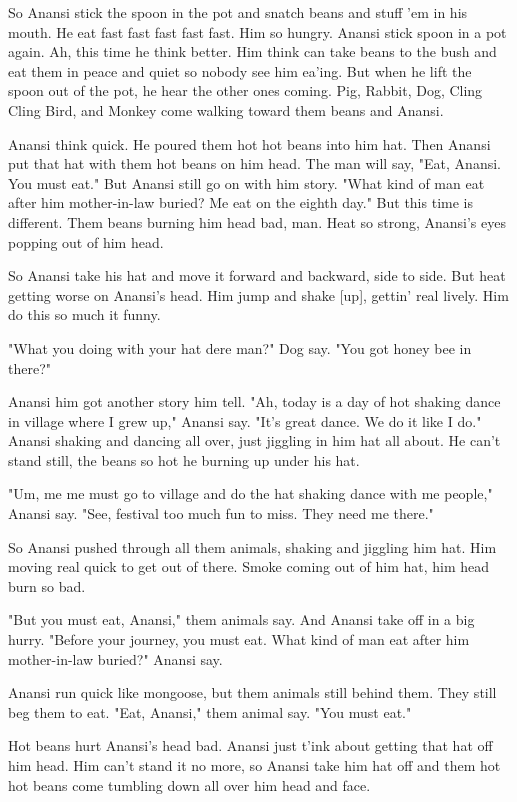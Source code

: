 So Anansi stick the spoon in the pot and snatch beans and stuff 'em in his mouth. He eat fast fast fast fast fast. Him so hungry. Anansi stick spoon in a pot again. Ah, this time he think better. Him think can take beans to the bush and eat them in peace and quiet so nobody see him ea'ing. But when he lift the spoon out of the pot, he hear the other ones coming. Pig, Rabbit, Dog, Cling Cling Bird, and Monkey come walking toward them beans and Anansi.

Anansi think quick. He poured them hot hot beans into him hat. Then Anansi put that hat with them hot beans on him head. The man will say, "Eat, Anansi. You must eat." But Anansi still go on with him story. "What kind of man eat after him mother-in-law buried? Me eat on the eighth day." But this time is different. Them beans burning him head bad, man. Heat so strong, Anansi's eyes popping out of him head.

So Anansi take his hat and move it forward and backward, side to side. But heat getting worse on Anansi's head. Him jump and shake [up], gettin' real lively. Him do this so much it funny.

"What you doing with your hat dere man?" Dog say. "You got honey bee in there?"

Anansi him got another story him tell. "Ah, today is a day of hot shaking dance in village where I grew up," Anansi say. "It's great dance. We do it like I do." Anansi shaking and dancing all over, just jiggling in him hat all about. He can't stand still, the beans so hot he burning up under his hat.

"Um, me me must go to village and do the hat shaking dance with me people," Anansi say. "See, festival too much fun to miss. They need me there."

So Anansi pushed through all them animals, shaking and jiggling him hat. Him moving real quick to get out of there. Smoke coming out of him hat, him head burn so bad.

"But you must eat, Anansi," them animals say. And Anansi take off in a big hurry. "Before your journey, you must eat. What kind of man eat after him mother-in-law buried?" Anansi say.

Anansi run quick like mongoose, but them animals still behind them. They still beg them to eat. "Eat, Anansi," them animal say. "You must eat."

Hot beans hurt Anansi's head bad. Anansi just t'ink about getting that hat off him head. Him can't stand it no more, so Anansi take him hat off and them hot hot beans come tumbling down all over him head and face.

